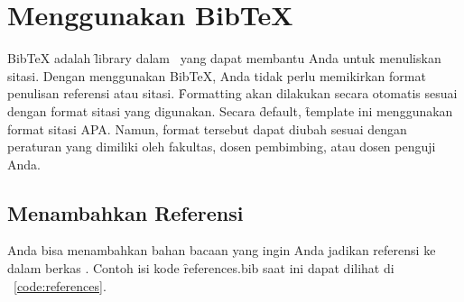 \section{Menggunakan BibTeX}
\label{sec:bibtex}
BibTeX adalah \f{library} dalam \latex~yang dapat membantu Anda untuk menuliskan sitasi. Dengan menggunakan BibTeX, Anda tidak perlu memikirkan format penulisan referensi atau sitasi. \f{Formatting} akan dilakukan secara otomatis sesuai dengan format sitasi yang digunakan. Secara \f{default}, \f{template} ini menggunakan format sitasi APA. Namun, format tersebut dapat diubah sesuai dengan peraturan yang dimiliki oleh fakultas, dosen pembimbing, atau dosen penguji Anda.


\subsection{Menambahkan Referensi}
\label{sec:bibtexAddRef}
Anda bisa menambahkan bahan bacaan yang ingin Anda jadikan referensi ke dalam berkas . Contoh isi kode \f{references.bib} saat ini dapat dilihat di \lst~\ref{code:references}.


